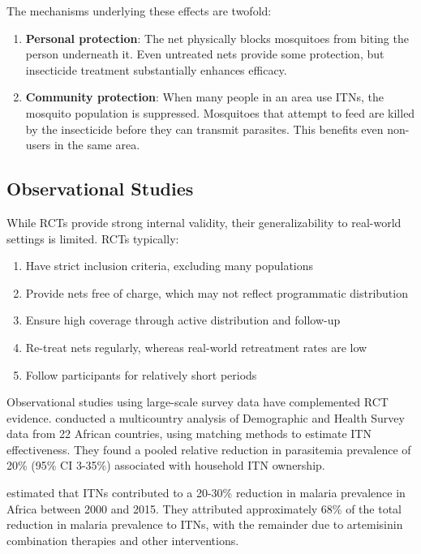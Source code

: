 The mechanisms underlying these effects are twofold:

\begin{enumerate}
	\item \textbf{Personal protection}: The net physically blocks mosquitoes from biting the person underneath it. Even untreated nets provide some protection, but insecticide treatment substantially enhances efficacy.
	
	\item \textbf{Community protection}: When many people in an area use ITNs, the mosquito population is suppressed. Mosquitoes that attempt to feed are killed by the insecticide before they can transmit parasites. This benefits even non-users in the same area.
\end{enumerate}

\subsection{Observational Studies}

While RCTs provide strong internal validity, their generalizability to real-world settings is limited. RCTs typically:

\begin{enumerate}
	\item Have strict inclusion criteria, excluding many populations
	\item Provide nets free of charge, which may not reflect programmatic distribution
	\item Ensure high coverage through active distribution and follow-up
	\item Re-treat nets regularly, whereas real-world retreatment rates are low
	\item Follow participants for relatively short periods
\end{enumerate}

Observational studies using large-scale survey data have complemented RCT evidence. \citet{lim2011net} conducted a multicountry analysis of Demographic and Health Survey data from 22 African countries, using matching methods to estimate ITN effectiveness. They found a pooled relative reduction in parasitemia prevalence of 20\% (95\% CI 3-35\%) associated with household ITN ownership.

\citet{bhatt2015effect} estimated that ITNs contributed to a 20-30\% reduction in malaria prevalence in Africa between 2000 and 2015. They attributed approximately 68\% of the total reduction in malaria prevalence to ITNs, with the remainder due to artemisinin combination therapies and other interventions.

